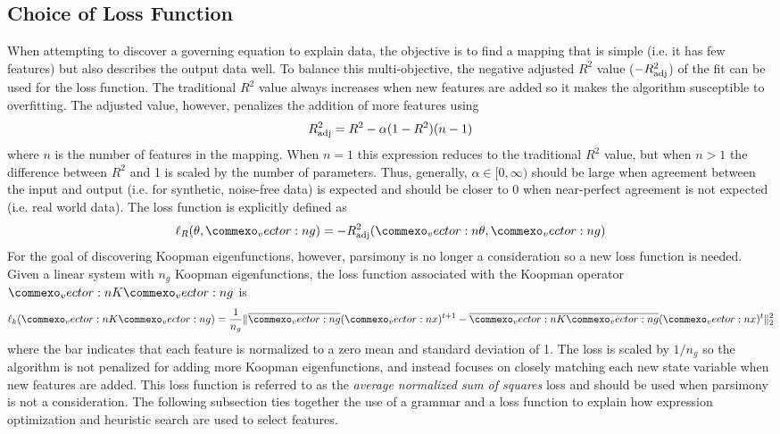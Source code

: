 \documentclass{article}
\renewcommand{\vec}[1]{\vect{#1}}
\newcommand{\mat}[1]{\vect{#1}}
\begin{document}
\subsection{Choice of Loss Function}
\label{lossfunction}
When attempting to discover a governing equation to explain data, the objective is to find a mapping that is simple (i.e. it has few features) but also describes the output data well. To balance this multi-objective, the negative adjusted $R^2$ value ($-R_{\rm adj}^2$) of the fit can be used for the loss function. The traditional $R^2$ value always increases when new features are added so it makes the algorithm susceptible to overfitting. The adjusted value, however, penalizes the addition of more features using
\begin{equation} 
R_{\rm adj}^2 = R^2 - \alpha (1-  R^2)(n-1)
\end{equation}
where $n$ is the number of features in the mapping. When $n=1$ this expression reduces to the traditional $R^2$ value, but when $n>1$ the difference between $R^2$ and 1 is scaled by the number of parameters. Thus, generally, $\alpha \in [0, \infty)$ should be large when agreement between the input and output (i.e. for synthetic, noise-free data) is expected and should be closer to 0 when near-perfect agreement is not expected (i.e. real world data). The loss function is explicitly defined as 
\begin{equation}
    \ell_R(\theta, \vec{g}) = - R_{\rm adj}^2(\vec{\theta}, \vec{g})
\end{equation}
For the goal of discovering Koopman eigenfunctions, however, parsimony is no longer a consideration so a new loss function is needed. Given a linear system with $n_g$ Koopman eigenfunctions, the loss function associated with the Koopman operator $\mat{K} \vec{g}$ is
\begin{equation} \ell_k(\mat{K} \vec{g}) = \frac{1}{n_g}\lVert \overline{\vec{g}}(\vec{x})^{t+1} - \overline{\mat{K} \vec{g}}(\vec{x})^{t}\rVert _2^2 \end{equation}
where the bar indicates that each feature is normalized to a zero mean and standard deviation of 1. The loss is scaled by $1/n_g$ so the algorithm is not penalized for adding more Koopman eigenfunctions, and instead focuses on closely matching each new state variable when new features are added. This loss function is referred to as the \emph{average normalized sum of squares} loss and should be used when parsimony is not a consideration. The following subsection ties together the use of a grammar and a loss function to explain how expression optimization and heuristic search are used to select features.
\end{document}
